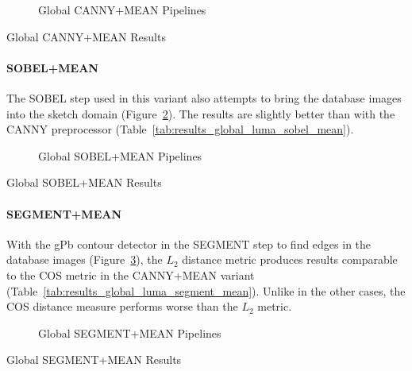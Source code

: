 \begin{figure}[h]
    \centering
    
    \caption[Global CANNY+MEAN Pipelines]{
        Global CANNY+MEAN Pipelines
    }
    \label{fig:pipeline_global_luma_canny_mean}
\end{figure}

\begin{table}[h]
    \centering
    
    \caption[Global CANNY+MEAN Results]{
        Global CANNY+MEAN Results
    }
    \label{tab:results_global_luma_canny_mean}
\end{table}

\paragraph{SOBEL+MEAN}

The SOBEL step used in this variant also attempts to bring the database images
into the sketch domain (Figure~\ref{fig:pipeline_global_luma_sobel_mean}). The
results are slightly better than with the CANNY preprocessor
(Table~\ref{tab:results_global_luma_sobel_mean}).

\begin{figure}[h]
    \centering
    
    \caption[Global SOBEL+MEAN Pipelines]{
        Global SOBEL+MEAN Pipelines
    }
    \label{fig:pipeline_global_luma_sobel_mean}
\end{figure}

\begin{table}[h]
    \centering
    
    \caption[Global SOBEL+MEAN Results]{
        Global SOBEL+MEAN Results
    }
    \label{tab:results_global_luma_sobel_mean}
\end{table}

\paragraph{SEGMENT+MEAN}

With the gPb contour detector in the SEGMENT step to find edges in the database
images (Figure~\ref{fig:pipeline_global_luma_segment_mean}), the $L_2$ distance
metric produces results comparable to the COS metric in the CANNY+MEAN variant
(Table~\ref{tab:results_global_luma_segment_mean}).  Unlike in the other cases,
the COS distance measure performs worse than the $L_2$ metric.

\begin{figure}[h]
    \centering
    
    \caption[Global SEGMENT+MEAN Pipelines]{
        Global SEGMENT+MEAN Pipelines
    }
    \label{fig:pipeline_global_luma_segment_mean}
\end{figure}

\begin{table}[h]
    \centering
    
    \caption[Global SEGMENT+MEAN Results]{
        Global SEGMENT+MEAN Results
    }
    \label{tab:results_global_luma_segment_mean}
\end{table}
